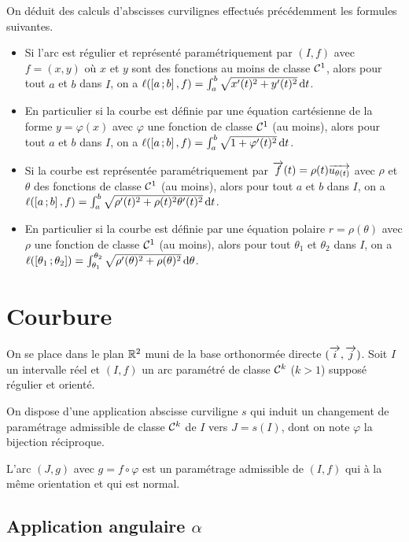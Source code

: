 On déduit des calculs d'abscisses curvilignes effectués précédemment les
formules suivantes.
\begin{itemize}
  \item Si l'arc est régulier et représenté paramétriquement par \((I, f)\) avec
    \(f=(x,y)\) où \(x\) et \(y\) sont des fonctions au moins de classe
    \(\mathcal{C}^{1}\), alors pour tout \(a\) et \(b\) dans \(I\), on a
    \(\ell(\left[ a \, ; {} b \right],f)=\int_a^b\sqrt{x'(t)^2+y'(t)^2}\mathop{}\mathopen{}\mathrm{d} t\).
  \item En particulier si la courbe est définie par une équation cartésienne de
    la forme \(y=\varphi(x)\) avec \(\varphi\) une fonction de classe
    \(\mathcal{C}^{1}\) (au moins), alors pour tout \(a\) et \(b\) dans \(I\), on a
    \(\ell(\left[ a \, ; {} b \right],f)=\int_a^b\sqrt{1+\varphi'(t)^2}\mathop{}\mathopen{}\mathrm{d} t\).
  \item Si la courbe est représentée paramétriquement par
    \(\overrightarrow{f}(t)=\rho(t)\overrightarrow{u_{\theta(t)}}\) avec \(\rho\) et \(\theta\) des
    fonctions de classe \(\mathcal{C}^{1}\) (au moins), alors pour tout \(a\) et
    \(b\) dans \(I\), on a
    \(\ell(\left[ a \, ; {} b \right],f)=\int_a^b\sqrt{\rho'(t)^2+\rho(t)^2\theta'(t)^2}\mathop{}\mathopen{}\mathrm{d}
    t\).
  \item En particulier si la courbe est définie par une équation polaire
    \(r=\rho(\theta)\) avec \(\rho\) une fonction de classe \(\mathcal{C}^{1}\) (au
    moins), alors pour tout \(\theta_1\) et \(\theta_2\) dans \(I\), on a
    \(\ell(\left[ \theta_1 \, ; {} \theta_2 \right])=\int_{\theta_1}^{\theta_2}\sqrt{\rho'(\theta)^2+\rho(\theta)^2}\mathop{}\mathopen{}\mathrm{d}
    \theta\).
\end{itemize}

\section{Courbure}

On se place dans le plan \(\mathbb{R}^2\) muni de la base orthonormée directe \((\overrightarrow{i},
\overrightarrow{j})\). Soit \(I\) un intervalle réel et \((I,f)\) un arc paramétré de classe
\(\mathcal{C}^{k}\) (\(k>1\)) supposé régulier et orienté.

On dispose d'une application abscisse curviligne \(s\) qui induit un changement
de paramétrage admissible de classe \(\mathcal{C}^{k}\) de \(I\) vers \(J=s(I)\),
dont on note \(\varphi\) la bijection réciproque.

L'arc \((J, g)\) avec \(g=f \circ \varphi\) est un paramétrage admissible de
\((I,f)\) qui à la même orientation et qui est normal.

\subsection{Application angulaire \(\alpha\)}

